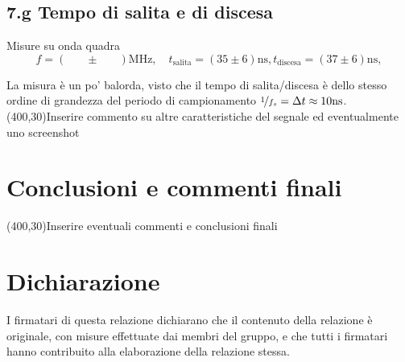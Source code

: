 \documentclass[10pt,a4paper]{article}
\newcommand{\exn}{\phantom{xxx}}
\begin{document}
\subsection*{7.g Tempo di salita e di discesa}
Misure su onda quadra
\[
f = (\exn \pm \exn) \mathrm{MHz}, \quad
t_\mathrm{salita} = (35 \pm 6) \mathrm{ns},
t_\mathrm{discesa} = (37 \pm 6) \mathrm{ns},
\]

La misura è un po' balorda, visto che il tempo di salita/discesa è dello
stesso ordine di grandezza del periodo di campionamento $\nicefrac{1}{f_s} = \Delta t \approx 10 \si{\ns}$.
\framebox(400,30){Inserire commento su altre caratteristiche del segnale
ed eventualmente uno screenshot}

\section{Conclusioni e commenti finali}
\framebox(400,30){Inserire eventuali commenti e conclusioni finali}

\section*{Dichiarazione}
I firmatari di questa relazione dichiarano che il contenuto della relazione
\`e originale, con misure effettuate dai membri del gruppo, e che tutti i
firmatari hanno contribuito alla elaborazione della relazione stessa.
\end{document}
